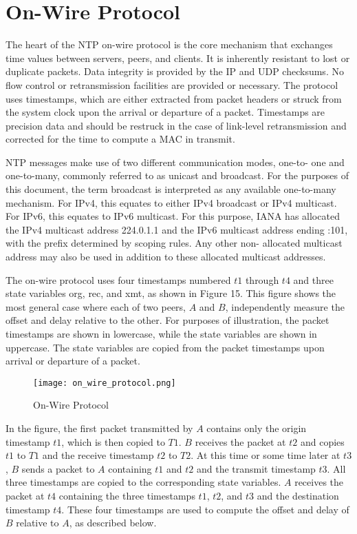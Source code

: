 \chapter{On-Wire Protocol}

The heart of the NTP on-wire protocol is the core mechanism that
exchanges time values between servers, peers, and clients. It is
inherently resistant to lost or duplicate packets. Data integrity is
provided by the IP and UDP checksums. No flow control or
retransmission facilities are provided or necessary. The protocol
uses timestamps, which are either extracted from packet headers or
struck from the system clock upon the arrival or departure of a
packet. Timestamps are precision data and should be restruck in the
case of link-level retransmission and corrected for the time to
compute a MAC in transmit.

NTP messages make use of two different communication modes, one-to-
one and one-to-many, commonly referred to as unicast and broadcast.
For the purposes of this document, the term broadcast is interpreted
as any available one-to-many mechanism. For IPv4, this equates to
either IPv4 broadcast or IPv4 multicast. For IPv6, this equates to
IPv6 multicast. For this purpose, IANA has allocated the IPv4
multicast address 224.0.1.1 and the IPv6 multicast address ending
:101, with the prefix determined by scoping rules. Any other non-
allocated multicast address may also be used in addition to these
allocated multicast addresses.

The on-wire protocol uses four timestamps numbered $ t1 $ through $ t4 $ and
three state variables org, rec, and xmt, as shown in Figure 15. This
figure shows the most general case where each of two peers, $ A $ and $ B $,
independently measure the offset and delay relative to the other.
For purposes of illustration, the packet timestamps are shown in
lowercase, while the state variables are shown in uppercase. The
state variables are copied from the packet timestamps upon arrival or
departure of a packet.

\begin{figure}
\centering
\texttt{[image: on\_wire\_protocol.png]}
\caption{On-Wire Protocol}
\label{on_wire_protocol}
\end{figure}

In the figure, the first packet transmitted by $ A $ contains only the
origin timestamp $ t1 $, which is then copied to $ T1 $. $ B $ receives the
packet at $ t2 $ and copies $ t1 $ to $ T1 $ and the receive timestamp $ t2 $ to $ T2 $.
At this time or some time later at $ t3 $, $ B $ sends a packet to $ A $
containing $ t1 $ and $ t2 $ and the transmit timestamp $ t3 $. All three
timestamps are copied to the corresponding state variables. $ A $
receives the packet at $ t4 $ containing the three timestamps $ t1 $, $ t2 $, and
$ t3 $ and the destination timestamp $ t4 $. These four timestamps are used
to compute the offset and delay of $ B $ relative to $ A $, as described
below.

